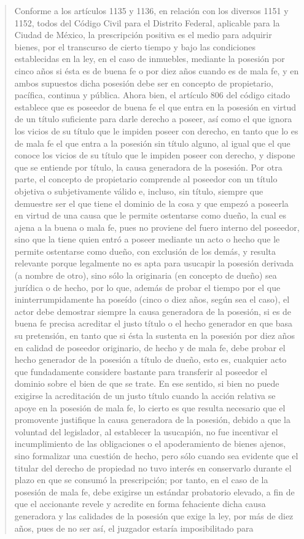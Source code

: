 \documentclass[11pt,a4paper]{article}
\begin{document}
\begin{quote}
Conforme a los artículos 1135 y 1136, en relación con los diversos 1151 y 1152, todos del Código
Civil para el Distrito Federal, aplicable para la Ciudad de México, la prescripción positiva es el medio
para adquirir bienes, por el transcurso de cierto tiempo y bajo las condiciones establecidas en la ley,
en el caso de inmuebles, mediante la posesión por cinco años si ésta es de buena fe o por diez
años cuando es de mala fe, y en ambos supuestos dicha posesión debe ser en concepto de
propietario, pacífica, continua y pública. Ahora bien, el artículo 806 del código citado establece que
es poseedor de buena fe el que entra en la posesión en virtud de un título suficiente para darle
derecho a poseer, así como el que ignora los vicios de su título que le impiden poseer con derecho,
en tanto que lo es de mala fe el que entra a la posesión sin título alguno, al igual que el que conoce
los vicios de su título que le impiden poseer con derecho, y dispone que se entiende por título, la
causa generadora de la posesión. Por otra parte, el concepto de propietario comprende al poseedor
con un título objetiva o subjetivamente válido e, incluso, sin título, siempre que demuestre ser el que
tiene el dominio de la cosa y que empezó a poseerla en virtud de una causa que le permite
ostentarse como dueño, la cual es ajena a la buena o mala fe, pues no proviene del fuero interno
del poseedor, sino que la tiene quien entró a poseer mediante un acto o hecho que le permite
ostentarse como dueño, con exclusión de los demás, y resulta relevante porque legalmente no es
apta para usucapir la posesión derivada (a nombre de otro), sino sólo la originaria (en concepto de
dueño) sea jurídica o de hecho, por lo que, además de probar el tiempo por el que
ininterrumpidamente ha poseído (cinco o diez años, según sea el caso), el actor debe demostrar
siempre la causa generadora de la posesión, si es de buena fe precisa acreditar el justo título o el
hecho generador en que basa su pretensión, en tanto que si ésta la sustenta en la posesión por diez
años en calidad de poseedor originario, de hecho y de mala fe, debe probar el hecho generador de
la posesión a título de dueño, esto es, cualquier acto que fundadamente considere bastante para
transferir al poseedor el dominio sobre el bien de que se trate. En ese sentido, si bien no puede
exigirse la acreditación de un justo título cuando la acción relativa se apoye en la posesión de mala
fe, lo cierto es que resulta necesario que el promovente justifique la causa generadora de la
posesión, debido a que la voluntad del legislador, al establecer la usucapión, no fue incentivar el
incumplimiento de las obligaciones o el apoderamiento de bienes ajenos, sino formalizar una
cuestión de hecho, pero sólo cuando sea evidente que el titular del derecho de propiedad no tuvo
interés en conservarlo durante el plazo en que se consumó la prescripción; por tanto, en el caso de
la posesión de mala fe, debe exigirse un estándar probatorio elevado, a fin de que el accionante
revele y acredite en forma fehaciente dicha causa generadora y las calidades de la posesión que
exige la ley, por más de diez años, pues de no ser así, el juzgador estaría imposibilitado para



\end{quote}
\end{document}
